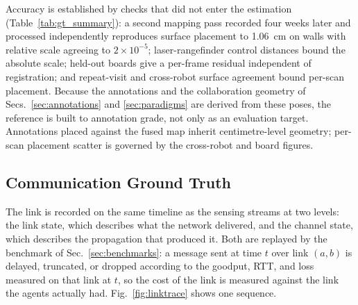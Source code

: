 \documentclass[journal]{IEEEtran}
\begin{document}


Accuracy is established by checks that did not enter the estimation
(Table~\ref{tab:gt_summary}): a second mapping pass recorded four
weeks later and processed independently reproduces surface placement
to \SI{1.06}{\centi\metre} on walls with relative scale agreeing to
$2\times10^{-5}$; laser-rangefinder control distances bound the
absolute scale; held-out boards give a per-frame residual independent
of registration; and repeat-visit and cross-robot surface agreement
bound per-scan placement. Because the annotations and the
collaboration geometry of Secs.~\ref{sec:annotations} and
\ref{sec:paradigms} are derived from these poses, the reference is
built to annotation grade, not only as an evaluation target.
Annotations placed against the fused map inherit centimetre-level
geometry; per-scan placement scatter is governed by the cross-robot
and board figures.



\subsection{Communication Ground Truth}
\label{sec:commgt}
The link is recorded on the same timeline as the sensing streams at
two levels: the link state, which describes what the network
delivered, and the channel state, which describes the propagation
that produced it. Both are replayed by the benchmark of
Sec.~\ref{sec:benchmarks}: a message sent at time $t$ over link
$(a,b)$ is delayed, truncated, or dropped according to the goodput,
RTT, and loss measured on that link at $t$, so the cost of the link
is measured against the link the agents actually had.
Fig.~\ref{fig:linktrace} shows one sequence.
\end{document}
